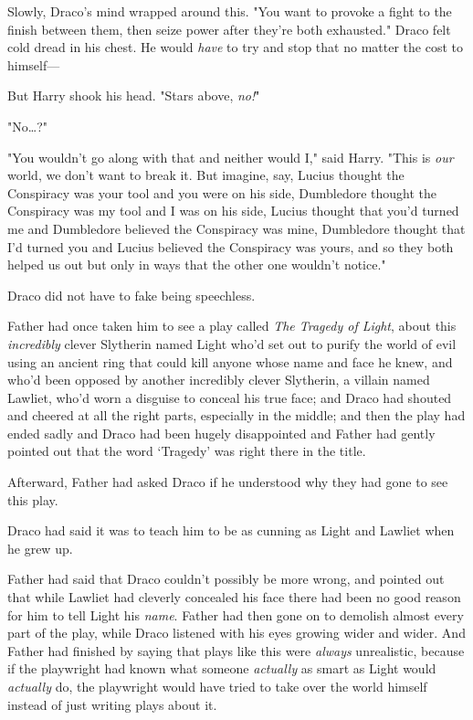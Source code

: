 Slowly, Draco's mind wrapped around this. "You want to provoke a fight to the
finish between them, then seize power after they're both exhausted." Draco felt
cold dread in his chest. He would \emph{have} to try and stop that no matter
the cost to himself---

But Harry shook his head. "Stars above, \emph{no!}"

"No{\ldots}?"

"You wouldn't go along with that and neither would I," said Harry. "This is
\emph{our} world, we don't want to break it. But imagine, say, Lucius thought
the Conspiracy was your tool and you were on his side, Dumbledore thought the
Conspiracy was my tool and I was on his side, Lucius thought that you'd turned
me and Dumbledore believed the Conspiracy was mine, Dumbledore thought that I'd
turned you and Lucius believed the Conspiracy was yours, and so they both
helped us out but only in ways that the other one wouldn't notice."

Draco did not have to fake being speechless.

Father had once taken him to see a play called \emph{The Tragedy of Light},
about this \emph{incredibly} clever Slytherin named Light who'd set out to
purify the world of evil using an ancient ring that could kill anyone whose
name and face he knew, and who'd been opposed by another incredibly clever
Slytherin, a villain named Lawliet, who'd worn a disguise to conceal his true
face; and Draco had shouted and cheered at all the right parts, especially in
the middle; and then the play had ended sadly and Draco had been hugely
disappointed and Father had gently pointed out that the word `Tragedy' was
right there in the title.

Afterward, Father had asked Draco if he understood why they had gone to see
this play.

Draco had said it was to teach him to be as cunning as Light and Lawliet when
he grew up.

Father had said that Draco couldn't possibly be more wrong, and pointed out
that while Lawliet had cleverly concealed his face there had been no good
reason for him to tell Light his \emph{name}. Father had then gone on to
demolish almost every part of the play, while Draco listened with his eyes
growing wider and wider. And Father had finished by saying that plays like this
were \emph{always} unrealistic, because if the playwright had known what
someone \emph{actually} as smart as Light would \emph{actually} do, the
playwright would have tried to take over the world himself instead of just
writing plays about it.

